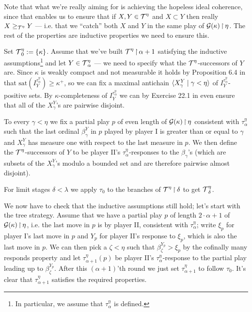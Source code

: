\documentclass[../../main]{subfiles}
\begin{document}
{	Note that what we're really aiming for is achieving the hopeless ideal coherence, since that enables us to ensure that if $X,Y\in\operatorname{\mathcal T}^\eta$ and $X\subset Y$ then really $X\geq_{\operatorname{\mathcal T}^\eta}Y$ --- i.e. that we ``catch'' both $X$ and $Y$ in the same play of $\operatorname{\mathcal G}(\kappa)\operatorname{\upharpoonright}\eta$. The rest of the properties are inductive properties we need to ensure this.

	\qquad Set $\operatorname{\mathcal T}^\eta_0:=\{\kappa\}$. Assume that we've built $\operatorname{\mathcal T}^\eta\operatorname{\upharpoonright}\alpha+1$ satisfying the inductive assumptions\footnote{In particular, we assume that $\tau^\eta_\alpha$ is defined.} and let $Y\in\operatorname{\mathcal T}^\eta_\alpha$ --- we need to specify what the $\operatorname{\mathcal T}^\eta$-successors of $Y$ are. Since $\kappa$ is weakly compact and not measurable it holds by Proposition 6.4 in \cite{Kanamori} that $\text{sat}(I_Y^{\tau^\eta_\alpha})\geq\kappa^+$, so we can fix a maximal antichain $\langle X_\gamma^Y\mid\gamma<\eta\rangle$ of $I_Y^{\tau^\eta_\alpha}$-positive sets. By $\kappa$-completeness of $I_Y^{\tau^\eta_\alpha}$ we can by Exercise 22.1 in \cite{Jech} even ensure that all of the $X_\gamma^Y$'s are pairwise disjoint.
	
	\qquad To every $\gamma<\eta$ we fix a partial play $p$ of even length of $\operatorname{\mathcal G}(\kappa)\operatorname{\upharpoonright}\eta$ consistent with $\tau^\eta_\alpha$ such that the last ordinal $\beta_\gamma^Y$ in $p$ played by player I is greater than or equal to $\gamma$ and $X_\gamma^Y$ has measure one with respect to the last measure in $p$. We then define the $\operatorname{\mathcal T}^\eta$-successors of $Y$ to be player II's $\tau^\eta_\alpha$-responses to the $\beta_\gamma$'s (which are subsets of the $X_\gamma^Y$'s modulo a bounded set and are therefore pairwise almost disjoint).

  \qquad For limit stages $\delta<\lambda$ we apply $\tau_0$ to the branches of $\operatorname{\mathcal T}^\eta\operatorname{\upharpoonright}\delta$ to get $\operatorname{\mathcal T}^\eta_\delta$.

\qquad We now have to check that the inductive assumptions still hold; let's start with the tree strategy. Assume that we have a partial play $p$ of length $2\cdot\alpha+1$ of $\operatorname{\mathcal G}(\kappa)\operatorname{\upharpoonright}\eta$, i.e. the last move in $p$ is by player II, consistent with $\tau^\eta_\alpha$; write $\xi_p$ for player I's last move in $p$ and $Y_p$ for player II's response to $\xi_p$, which is also the last move in $p$. We can then pick a $\zeta<\eta$ such that $\beta_\zeta^{Y_p}>\xi_p$ by the cofinally many responds property and let $\tau^\eta_{\alpha+1}(p)$ be player II's $\tau^\eta_\alpha$-response to the partial play leading up to $\beta_\zeta^{Y_p}$. After this $(\alpha+1)$'th round we just set $\tau^\eta_{\alpha+1}$ to follow $\tau_0$. It's clear that $\tau^\eta_{\alpha+1}$ satisfies the required properties.

}
\end{document}
